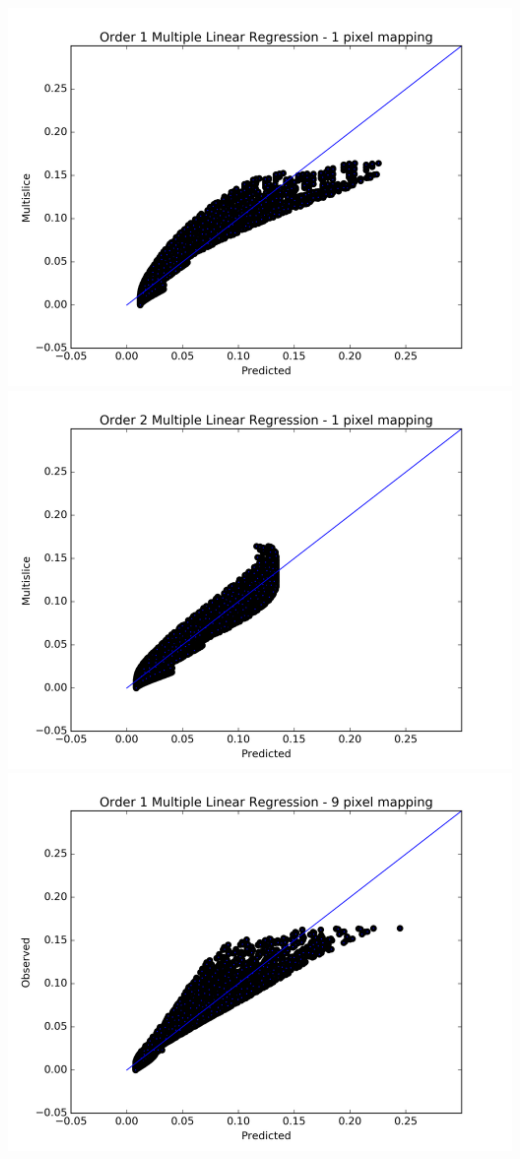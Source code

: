 \documentclass[11pt]{article}
\begin{document}
\includegraphics[width=.9\linewidth]{./images/olr_order1_1pixel.png}\\
\includegraphics[width=.9\linewidth]{./images/olr_order2_1pixel.png}\\
\includegraphics[width=.9\linewidth]{./images/olr_order1_9pixel.png}\\
\end{document}
